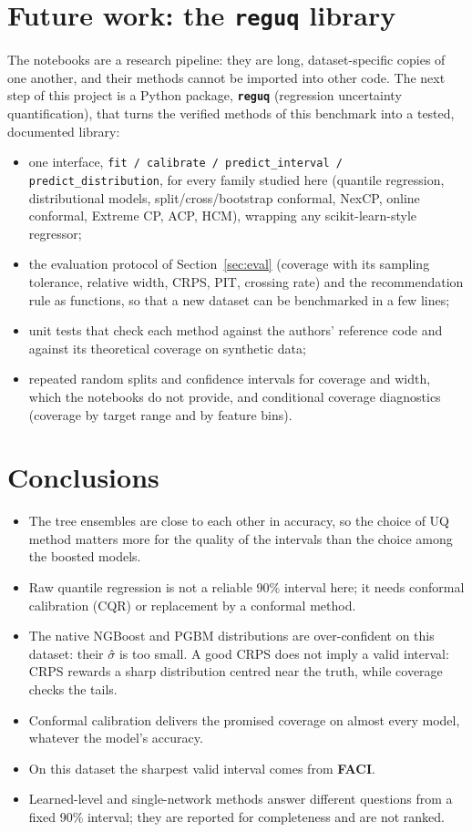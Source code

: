 \documentclass[11pt]{article}
\begin{document}
\section{Future work: the \texttt{reguq} library}\label{sec:future}
The notebooks are a research pipeline: they are long, dataset-specific copies of one another, and their methods cannot be imported
into other code. The next step of this project is a Python package, \textbf{\texttt{reguq}} (regression uncertainty quantification),
that turns the verified methods of this benchmark into a tested, documented library:
\begin{itemize}
\item one interface, \texttt{fit / calibrate / predict\_interval / predict\_distribution}, for every family studied here (quantile
regression, distributional models, split/cross/bootstrap conformal, NexCP, online conformal, Extreme CP, ACP, HCM), wrapping any
scikit-learn-style regressor;
\item the evaluation protocol of Section~\ref{sec:eval} (coverage with its sampling tolerance, relative width, CRPS, PIT, crossing
rate) and the recommendation rule as functions, so that a new dataset can be benchmarked in a few lines;
\item unit tests that check each method against the authors' reference code and against its theoretical coverage on synthetic data;
\item repeated random splits and confidence intervals for coverage and width, which the notebooks do not provide, and conditional
coverage diagnostics (coverage by target range and by feature bins).
\end{itemize}

\section{Conclusions}
\begin{itemize}
\item The tree ensembles are close to each other in accuracy, so the choice of UQ method matters more for the quality of the intervals than the choice among the boosted models.
\item Raw quantile regression is not a reliable 90\% interval here; it needs conformal calibration (CQR) or replacement by a conformal method.
\item The native NGBoost and PGBM distributions are over-confident on this dataset: their $\sigma$̂ is too small. A good CRPS does not imply a valid interval: CRPS rewards a sharp distribution centred near the truth, while coverage checks the tails.
\item Conformal calibration delivers the promised coverage on almost every model, whatever the model's accuracy.
\item On this dataset the sharpest valid interval comes from \textbf{FACI}.
\item Learned-level and single-network methods answer different questions from a fixed 90\% interval; they are reported for completeness and are not ranked.
\end{itemize}
\end{document}
